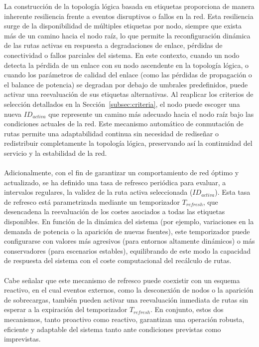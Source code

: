 La construcción de la topología lógica basada en etiquetas proporciona de manera inherente resiliencia frente a eventos disruptivos o fallos en la red. Esta resiliencia surge de la disponibilidad de múltiples etiquetas por nodo, siempre que exista más de un camino hacia el nodo raíz, lo que permite la reconfiguración dinámica de las rutas activas en respuesta a degradaciones de enlace, pérdidas de conectividad o fallos parciales del sistema. En este contexto, cuando un nodo detecta la pérdida de un enlace con su nodo ascendente en la topología lógica, o cuando los parámetros de calidad del enlace (como las pérdidas de propagación o el balance de potencia) se degradan por debajo de umbrales predefinidos, puede activar una reevaluación de sus etiquetas alternativas. Al reaplicar los criterios de selección detallados en la Sección~\ref{subsec:criteria}, el nodo puede escoger una nueva $ID_{activa}$ que represente un camino más adecuado hacia el nodo raíz bajo las condiciones actuales de la red. Este mecanismo automático de conmutación de rutas permite una adaptabilidad continua sin necesidad de rediseñar o redistribuir completamente la topología lógica, preservando así la continuidad del servicio y la estabilidad de la red.\\
\\
Adicionalmente, con el fin de garantizar un comportamiento de red óptimo y actualizado, se ha definido una tasa de refresco periódica para evaluar, a intervalos regulares, la validez de la ruta activa seleccionada ($ID_{activa}$). Esta tasa de refresco está parametrizada mediante un temporizador $T_{refresh}$, que desencadena la reevaluación de los costes asociados a todas las etiquetas disponibles. En función de la dinámica del sistema (por ejemplo, variaciones en la demanda de potencia o la aparición de nuevas fuentes), este temporizador puede configurarse con valores más agresivos (para entornos altamente dinámicos) o más conservadores (para escenarios estables), equilibrando de este modo la capacidad de respuesta del sistema con el coste computacional del recálculo de rutas. \\
\\
Cabe señalar que este mecanismo de refresco puede coexistir con un esquema reactivo, en el cual eventos externos, como la desconexión de nodos o la aparición de sobrecargas, también pueden activar una reevaluación inmediata de rutas sin esperar a la expiración del temporizador $T_{refresh}$. En conjunto, estos dos mecanismos, tanto proactivo como reactivo, garantizan una operación robusta, eficiente y adaptable del sistema tanto ante condiciones previstas como imprevistas.

